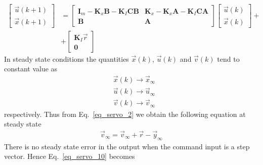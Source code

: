 \documentclass[11pt,a4paper,oneside]{book}
\numberwithin{equation}{section}
\theoremstyle{it}
\theoremstyle{definition}
\begin{document}
\begin{equation}\label{eq_servo_10}
	\begin{aligned}
		\begin{bmatrix}
			\vec{u}(k+1) \\[6pt]  
			\vec{x}(k+1)
		\end{bmatrix} &=
		\begin{bmatrix}
			\mathbf{I}_m-\mathbf{K}_x\mathbf{B}-\mathbf{K}_I\mathbf{C}\mathbf{B}
			&  
			\mathbf{K}_x-\mathbf{K}_x\mathbf{A}-\mathbf{K}_I\mathbf{C}\mathbf{A}\\[6pt]
			
			\mathbf{B} & \mathbf{A}
		\end{bmatrix}
		\begin{bmatrix}
			\vec{u}(k) \\[6pt]  
			\vec{x}(k)
		\end{bmatrix} + \\[6pt]
		&+
		\begin{bmatrix}
			\mathbf{K}_I\vec{r} \\[6pt]  
			\mathbf{0}
		\end{bmatrix}
	\end{aligned}
\end{equation}
In steady state conditions the quantities $\vec{x}(k)$, $\vec{u}(k)$ and 
$\vec{v}(k)$ tend to constant value as 
\begin{equation}
	\begin{aligned}
		&\vec{x}(k)\rightarrow\vec{x}_{\infty} \\[6pt]
		&\vec{u}(k)\rightarrow\vec{u}_{\infty} \\[6pt]
		&\vec{v}(k)\rightarrow\vec{v}_{\infty}
	\end{aligned}
\end{equation}
respectively. Thus from Eq.~\eqref{eq_servo_2} we obtain the following equation 
at steady state
\begin{equation}
	\begin{aligned}
		\vec{v}_{\infty} = \vec{v}_{\infty} +\vec{r}-\vec{y}_{\infty}
	\end{aligned}
\end{equation}
There is no steady state error in the output when the command input is a step 
vector. Hence Eq.~\eqref{eq_servo_10} becomes
\end{document}
